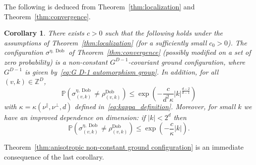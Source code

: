 \documentclass[11pt, reqno]{amsart}
\newtheorem{corollary}[theorem]{Corollary}
\newcommand{\Z}{\mathbb{Z}}
\DeclareMathOperator{\Dob}{Dob}
\renewcommand{\P}{\mathbb{P}}
\numberwithin{equation}{section}
\begin{document}
The following is deduced from Theorem~\ref{thm:localization} and Theorem~\ref{thm:convergence}.
\begin{corollary}\label{cor:covariant Dobrushin configuration}
There exists $c>0$ such that the following holds under the assumptions of Theorem~\ref{thm:localization} (for a sufficiently small $c_0>0$). 
The configuration $\sigma^{\eta,\Dob}$ of Theorem~\ref{thm:convergence} (possibly modified on a set of zero probability) is a non-constant $G^{D-1}$-covariant ground configuration, where $G^{D-1}$ is given by~\eqref{eq:G D-1 automorphism group}. In addition, for all $(v,k)\in \Z^{D}$,
\begin{equation}\label{eq:cor_localization at v k}
\P\left(\sigma^{\eta,\Dob}_{(v,k)} \neq \rho^{\Dob}_{(v,k)}\right) \leq           
\exp\left(-\frac{c}{d^2 \kappa}  |k|^{\frac{d-2}{d-1}}\right)
\end{equation}
with $\kappa=\kappa(\nu^\parallel, \nu^\perp,d)$ defined in~\eqref{eq:kappa_definition}.
Moreover, for small $k$ we have an improved dependence on dimension: 
if $ |k| < 2^d$ then 
\begin{equation}\label{eq:cor_localization at v k moreover}
\P\left(\sigma^{\eta,\Dob}_{(v,k)} \neq \rho^{\Dob}_{(v,k)}\right) \leq \exp\left(-\frac{c}{\kappa} |k| \right).
\end{equation}
\end{corollary}

Theorem~\ref{thm:anisotropic non-constant ground configuration} is an immediate consequence of the last corollary.
\end{document}
